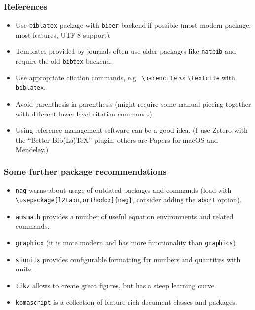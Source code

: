 \documentclass[aspectratio=1610]{beamer}
\begin{document}
\begin{frame}[fragile]
    \frametitle{References}
    \begin{itemize}
        \item Use \verb+biblatex+ package with \verb+biber+ backend if possible (most modern package, most features, UTF-8 support).
        \item Templates provided by journals often use older packages like \verb+natbib+ and require the old \verb+bibtex+ backend.
        \item Use appropriate citation commands, e.g.~\verb+\parencite+ vs \verb+\textcite+ with \verb+biblatex+.
        \item Avoid parenthesis in parenthesis (might require some manual piecing together with different lower level citation commands).
        \item Using reference management software can be a good idea. (I use Zotero with the ``Better Bib(La)TeX'' plugin, others are Papers for macOS and Mendeley.)  %
    \end{itemize}
\end{frame}

\begin{frame}[fragile]
    \frametitle{Some further package recommendations}
    \begin{itemize}
        \item \verb+nag+ warns about usage of outdated packages and commands (load with \verb$\usepackage[l2tabu,orthodox]{nag}$, consider adding the \verb+abort+ option).
        \item \verb+amsmath+ provides a number of useful equation environments and related commands.
        \item \verb+graphicx+ (it is more modern and has more functionality than \verb+graphics+)
        \item \verb+siunitx+ provides configurable formatting for numbers and quantities with units.
        \item \verb+tikz+ allows to create great figures, but has a steep learning curve.
        \item \verb+komascript+ is a collection of feature-rich document classes and packages.
    \end{itemize}
\end{frame}
\end{document}
